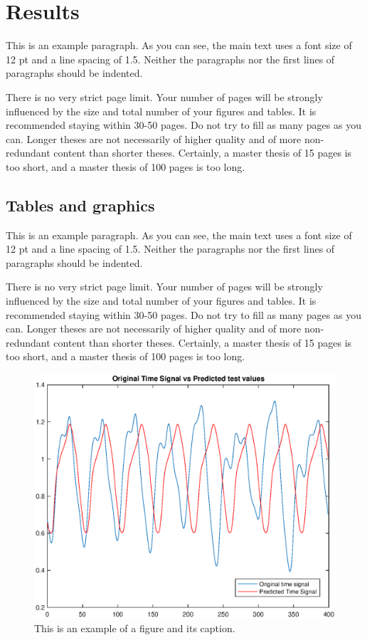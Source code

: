 
\chapter{Results}

This is an example paragraph. As you can see, the main text uses a font size of 12 pt and a line spacing of 1.5. Neither the paragraphs nor the first lines of paragraphs should be indented.

There is no very strict page limit. Your number of pages will be strongly influenced by the size and total number of your figures and tables. It is recommended staying within 30-50 pages. Do not try to fill as many pages as you can. Longer theses are not necessarily of higher quality and of more non-redundant content than shorter theses. Certainly, a master thesis of 15 pages is too short, and a master thesis of 100 pages is too long.

\section{Tables and graphics}

This is an example paragraph. As you can see, the main text uses a font size of 12 pt and a line spacing of 1.5. Neither the paragraphs nor the first lines of paragraphs should be indented.

There is no very strict page limit. Your number of pages will be strongly influenced by the size and total number of your figures and tables. It is recommended staying within 30-50 pages. Do not try to fill as many pages as you can. Longer theses are not necessarily of higher quality and of more non-redundant content than shorter theses. Certainly, a master thesis of 15 pages is too short, and a master thesis of 100 pages is too long.

 \begin{figure}[!ht]
  \includegraphics[clip,width=\columnwidth]{Figures/PlotTimeSeriesResult}%
\caption{This is an example of a figure and its caption.}
\label{fig:timeseries}
\end{figure}

